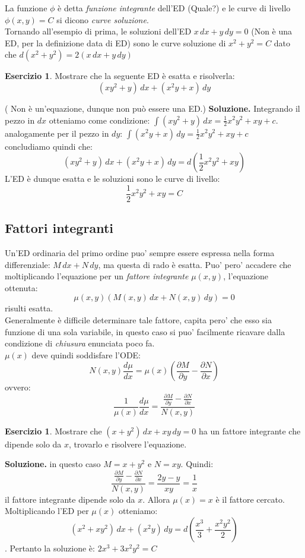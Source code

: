 \documentclass[a4paper,twoside]{article}
\theoremstyle{definition}
\newtheorem{ex}[theorem]{Esercizio}
\numberwithin{theorem}{section}
\begin{document}
La funzione $\phi$ è detta \emph{funzione integrante} dell'ED ({\color{red}Quale?}) e le curve di livello $\phi(x,y)=C$ si dicono \emph{curve soluzione}. \\
Tornando all'esempio di prima, le soluzioni dell'ED $x\, dx + y\, dy= 0$ ({\color{red}Non è una ED, per la definizione data di ED}) sono le curve soluzione di $x^2+y^2=C$ dato che $d(x^2+y^2)=2(x\, dx + y\, dy)$
\begin{ex}
    Mostrare che la seguente ED è esatta e risolverla:
    $$(xy^2+y)\,dx + (x^2y+x)\,dy$$
\end{ex}
({\color{red} Non è un'equazione, dunque non può essere una ED.})
\textbf{Soluzione.}
Integrando il pezzo in $dx$ otteniamo come condizione: $\int (xy^2+y)\,dx = \frac{1}{2}x^2y^2+xy +c$. \\
analogamente per il pezzo in $dy$: $\int(x^2y+x)\,dy=\frac{1}{2}x^2y^2+xy+c$\\
concludiamo quindi che: $$(xy^2+y)\,dx + (x^2y+x)\,dy= d(\frac{1}{2}x^2y^2 +xy)$$
L'ED è dunque esatta e le soluzioni sono le curve di livello: $$\frac{1}{2}x^2y^2 +xy=C$$
\subsection{Fattori integranti}
Un'ED ordinaria del primo ordine puo' sempre essere espressa nella forma differenziale: $M\,dx + N\,dy$, ma questa di rado è esatta. Puo' pero' accadere che moltiplicando l'equazione per un \emph{fattore integrante} $\mu(x,y)$, l'equazione ottenuta: $$\mu(x,y)(M(x,y)\,dx +N(x,y)\,dy)=0$$ risulti esatta. \\
Generalmente è difficile determinare tale fattore, capita pero' che esso sia funzione di una sola variabile, in questo caso si puo' facilmente ricavare dalla condizione di \emph{chiusura} enunciata poco fa. \\
$\mu(x)$ deve quindi soddisfare l'ODE:
$$N(x,y)\frac{d\mu}{dx}=\mu(x)(\frac{\partial M}{\partial y}-\frac{\partial N}{\partial x})$$
ovvero:
$$\frac{1}{\mu(x)}\frac{d\mu}{dx}=\frac{\frac{\partial M}{\partial y}-\frac{\partial N}{\partial x}}{N(x,y)}$$
\begin{ex}
    Mostrare che $(x+y^2)\,dx + xy\,dy=0$ ha un fattore integrante che dipende solo da $x$, trovarlo e risolvere l'equazione.
\end{ex}
\textbf{Soluzione.} in questo caso $M=x+y^2$ e $N=xy$. Quindi:
$$ \frac{\frac{\partial M}{\partial y}-\frac{\partial N}{\partial x}}{N(x,y)}=\frac{2y-y}{xy}=\frac{1}{x}$$ 
il fattore integrante dipende solo da $x$. Allora $\mu(x)=x$ è il fattore cercato. Moltiplicando l'ED per $\mu(x)$ otteniamo:
$$(x^2+xy^2)\,dx + (x^2y)\,dy= d(\frac{x^3}{3}+\frac{x^2y^2}{2})$$.
Pertanto la soluzione è: $2x^3+3x^2y^2=C$
\end{document}
